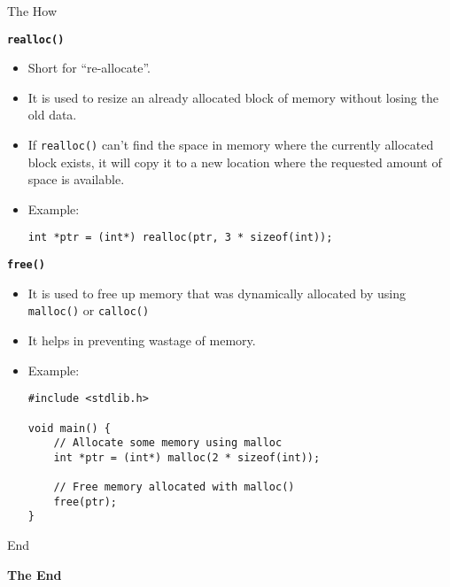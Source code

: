 \documentclass[11pt]{beamer}
\begin{document}
\begin{frame}{The How}
        \framebreak

        \textbf{\texttt{\large realloc()}}\\[10pt]

        \begin{itemize}
            \item Short for ``re-allocate''.
            \item It is used to resize an already allocated block of memory without losing the old data.
            \item If \texttt{realloc()} can't find the space in memory where the currently allocated block exists, it
            will copy it to a new location where the requested amount of space is available.
            \item Example:
            \begin{tcolorbox}
                \begin{verbatim}
int *ptr = (int*) realloc(ptr, 3 * sizeof(int));
                \end{verbatim}
            \end{tcolorbox}
        \end{itemize}

        \framebreak
        \textbf{\texttt{\large free()}}
        \begin{itemize}
            \item It is used to free up memory that was dynamically allocated by using \texttt{malloc()} or
            \texttt{calloc()}
            \item It helps in preventing wastage of memory.
            \item Example:
            \begin{tcolorbox}
                \begin{verbatim}
#include <stdlib.h>

void main() {
    // Allocate some memory using malloc
    int *ptr = (int*) malloc(2 * sizeof(int));

    // Free memory allocated with malloc()
    free(ptr);
}
                \end{verbatim}
            \end{tcolorbox}
        \end{itemize}

    \end{frame}

    \begin{frame}{End}
        \begin{center}
            \textbf{\Huge The End}
        \end{center}
    \end{frame}
\end{document}
